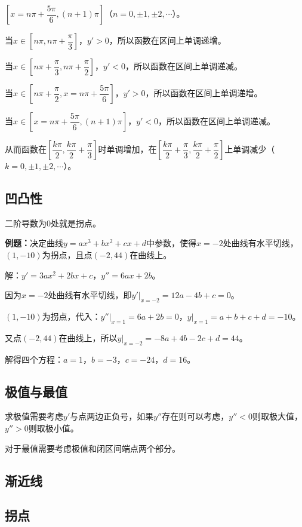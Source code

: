 \documentclass[UTF8, 12pt]{ctexart}
\begin{document}
$\left[x=n\pi+\dfrac{5\pi}{6},(n+1)\pi\right]$（$n=0,\pm 1,\pm2,\cdots$）。

当$x\in\left[n\pi,n\pi+\dfrac{\pi}{3}\right]$，$y'>0$，所以函数在区间上单调递增。

当$x\in\left[n\pi+\dfrac{\pi}{3},n\pi+\dfrac{\pi}{2}\right]$，$y'<0$，所以函数在区间上单调递减。

当$x\in\left[n\pi+\dfrac{\pi}{2},x=n\pi+\dfrac{5\pi}{6}\right]$，$y'>0$，所以函数在区间上单调递增。

当$x\in\left[x=n\pi+\dfrac{5\pi}{6},(n+1)\pi\right]$，$y'<0$，所以函数在区间上单调递减。

从而函数在$\left[\dfrac{k\pi}{2},\dfrac{k\pi}{2}+\dfrac{\pi}{3}\right]$时单调增加，在$\left[\dfrac{k\pi}{2}+\dfrac{\pi}{3},\dfrac{k\pi}{2}+\dfrac{\pi}{2}\right]$上单调减少（$k=0,\pm 1,\pm2,\cdots$）。

\subsection{凹凸性}

二阶导数为0处就是拐点。

\textbf{例题：}决定曲线$y=ax^3+bx^2+cx+d$中参数，使得$x=-2$处曲线有水平切线，$(1,-10)$为拐点，且点$(-2,44)$在曲线上。

解：$y'=3ax^2+2bx+c$，$y''=6ax+2b$。

因为$x=-2$处曲线有水平切线，即$y'\vert_{x=-2}=12a-4b+c=0$。

$(1,-10)$为拐点，代入：$y''\vert_{x=1}=6a+2b=0$，$y\vert_{x=1}=a+b+c+d=-10$。

又点$(-2,44)$在曲线上，所以$y\vert_{x=-2}=-8a+4b-2c+d=44$。

解得四个方程：$a=1$，$b=-3$，$c=-24$，$d=16$。

\subsection{极值与最值}

求极值需要考虑$y'$与点两边正负号，如果$y''$存在则可以考虑，$y''<0$则取极大值，$y''>0$则取极小值。

对于最值需要考虑极值和闭区间端点两个部分。

\subsection{渐近线}

\subsection{拐点}
\end{document}
